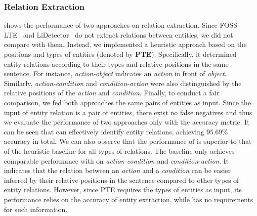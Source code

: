 \subsubsection{{Relation Extraction}}
 shows the performance of two approaches on relation extraction. Since FOSS-LTE~\cite{APSEC`17-Kapitsaki-termsIdentifying} and LiDetector~\cite{xu2021lidetector} do not extract relations between entities, we did not compare \tool with them. Instead, we implemented a heuristic approach based on the positions and types of entities (denoted by \textbf{PTE}). Specifically, it determined entity relations according to their types and relative positions in the same sentence. For instance, \textit{action-object} indicates an \textit{action} in front of \textit{object}. Similarly, \textit{action-condition} and \textit{condition-action} were also distinguished by the relative positions of the \textit{action} and \textit{condition}. %
Finally, to conduct a fair comparison, we fed both approaches the same pairs of entities as input. 
%
Since the input of entity relation is a pair of entities, there exist no false negatives and thus we evaluate the performance of two approaches only with the accuracy metric. It can be seen that \tool can effectively identify entity relations, achieving 95.69\% accuracy in total. We can also observe that the performance of \tool is superior to that of the heuristic baseline for all types of relations. The baseline only achieves comparable performance with \tool on \textit{action-condition} and \textit{condition-action}. It indicates that the relation between an \textit{action} and a \textit{condition} can be easier inferred by their relative positions in the sentence compared to other types of entity relations. However, since PTE requires the types of entities as input, its performance relies on the accuracy of entity extraction, while \tool has no requirements for such information.

